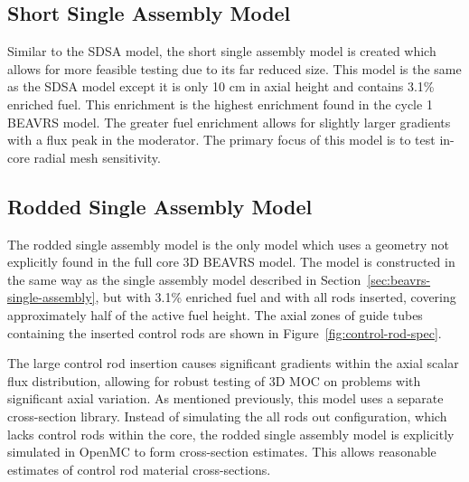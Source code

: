 \subsection{Short Single Assembly Model}
\label{sec:short-single-assembly}

Similar to the SDSA model, the short single assembly model is created which allows for more feasible testing due to its far reduced size. This model is the same as the SDSA model except it is only 10 cm in axial height and contains 3.1\% enriched fuel. This enrichment is the highest enrichment found in the cycle 1 BEAVRS model. The greater fuel enrichment allows for slightly larger gradients with a flux peak in the moderator. The primary focus of this model is to test in-core radial mesh sensitivity.


\subsection{Rodded Single Assembly Model}
\label{sec:rodded-single-assembly}

The rodded single assembly model is the only model which uses a geometry not explicitly found in the full core 3D BEAVRS model. The model is constructed in the same way as the single assembly model described in Section~\ref{sec:beavrs-single-assembly}, but with 3.1\% enriched fuel and with all rods inserted, covering approximately half of the active fuel height. The axial zones of guide tubes containing the inserted control rods are shown in Figure~\ref{fig:control-rod-spec}.



The large control rod insertion causes significant gradients within the axial scalar flux distribution, allowing for robust testing of 3D \ac{MOC} on problems with significant axial variation. As mentioned previously, this model uses a separate cross-section library. Instead of simulating the all rods out configuration, which lacks control rods within the core, the rodded single assembly model is explicitly simulated in OpenMC to form cross-section estimates. This allows reasonable estimates of control rod material cross-sections.

